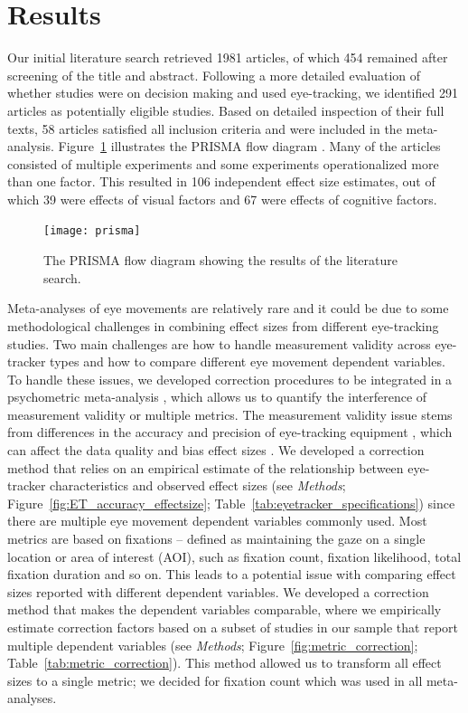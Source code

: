 
\section{Results}

Our initial literature search retrieved 1981 articles, of which 454 remained after screening of the title and abstract. Following a more detailed evaluation of whether studies were on decision making and used eye-tracking, we identified 291 articles as potentially eligible studies. Based on detailed inspection of their full texts, 58 articles satisfied all inclusion criteria and were included in the meta-analysis. Figure~\ref{fig:flow_diagram} illustrates the PRISMA flow diagram \citep{moher2009preferred}. Many of the articles consisted of multiple experiments and some experiments operationalized more than one factor. This resulted in 106 independent effect size estimates, out of which 39 were effects of visual factors and 67 were effects of cognitive factors.

\begin{figure}[H]
\texttt{[image: prisma]}
\centering
\caption{The PRISMA flow diagram showing the results of the literature search.}
\label{fig:flow_diagram}
\end{figure}


Meta-analyses of eye movements are relatively rare and it could be due to some methodological challenges in combining effect sizes from different eye-tracking studies. Two main challenges are how to handle measurement validity across eye-tracker types and how to compare different eye movement dependent variables. To handle these issues, we developed correction procedures to be integrated in a psychometric meta-analysis \citep{hunter2004a}, which allows us to quantify the interference of measurement validity or multiple metrics. The measurement validity issue stems from differences in the accuracy and precision of eye-tracking equipment \citep{holmqvist2015a}, which can affect the data quality and bias effect sizes \citep{orquin2016a}. We developed a correction method that relies on an empirical estimate of the relationship between eye-tracker characteristics and observed effect sizes (see \textit{Methods}; Figure~\ref{fig:ET_accuracy_effectsize}; Table~\ref{tab:eyetracker_specifications}) since there are multiple eye movement dependent variables commonly used. Most metrics are based on fixations -- defined as maintaining the gaze on a single location or area of interest (AOI), such as fixation count, fixation likelihood, total fixation duration and so on. This leads to a potential issue with comparing effect sizes reported with different dependent variables. We developed a correction method that makes the dependent variables comparable, where we empirically estimate correction factors based on a subset of studies in our sample that report multiple dependent variables (see \textit{Methods}; Figure~\ref{fig:metric_correction}; Table~\ref{tab:metric_correction}). This method allowed us to transform all effect sizes to a single metric; we decided for fixation count which was used in all meta-analyses. 

